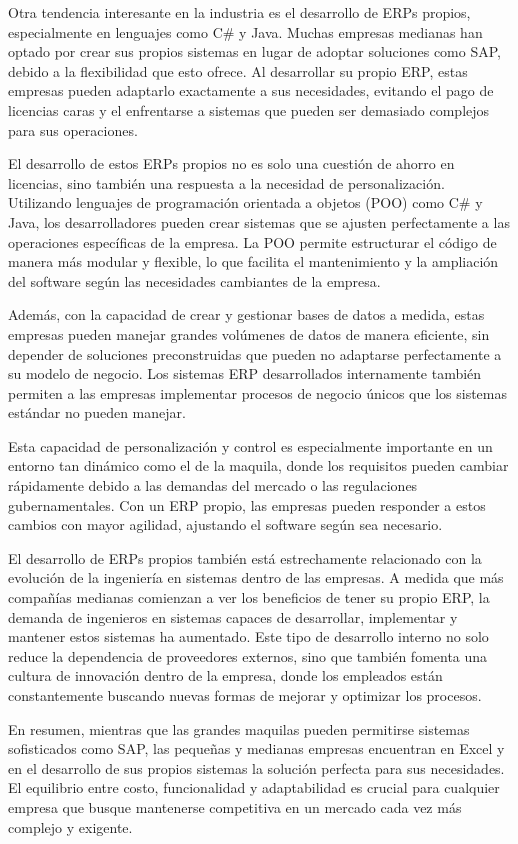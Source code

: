 \documentclass[
  10pt,
  letterpaper,
]{book}
\begin{document}
Otra tendencia interesante en la industria es el desarrollo de ERPs
propios, especialmente en lenguajes como C\# y Java. Muchas empresas
medianas han optado por crear sus propios sistemas en lugar de adoptar
soluciones como SAP, debido a la flexibilidad que esto ofrece. Al
desarrollar su propio ERP, estas empresas pueden adaptarlo exactamente a
sus necesidades, evitando el pago de licencias caras y el enfrentarse a
sistemas que pueden ser demasiado complejos para sus operaciones.

El desarrollo de estos ERPs propios no es solo una cuestión de ahorro en
licencias, sino también una respuesta a la necesidad de personalización.
Utilizando lenguajes de programación orientada a objetos (POO) como C\#
y Java, los desarrolladores pueden crear sistemas que se ajusten
perfectamente a las operaciones específicas de la empresa. La POO
permite estructurar el código de manera más modular y flexible, lo que
facilita el mantenimiento y la ampliación del software según las
necesidades cambiantes de la empresa.

Además, con la capacidad de crear y gestionar bases de datos a medida,
estas empresas pueden manejar grandes volúmenes de datos de manera
eficiente, sin depender de soluciones preconstruidas que pueden no
adaptarse perfectamente a su modelo de negocio. Los sistemas ERP
desarrollados internamente también permiten a las empresas implementar
procesos de negocio únicos que los sistemas estándar no pueden manejar.

Esta capacidad de personalización y control es especialmente importante
en un entorno tan dinámico como el de la maquila, donde los requisitos
pueden cambiar rápidamente debido a las demandas del mercado o las
regulaciones gubernamentales. Con un ERP propio, las empresas pueden
responder a estos cambios con mayor agilidad, ajustando el software
según sea necesario.

El desarrollo de ERPs propios también está estrechamente relacionado con
la evolución de la ingeniería en sistemas dentro de las empresas. A
medida que más compañías medianas comienzan a ver los beneficios de
tener su propio ERP, la demanda de ingenieros en sistemas capaces de
desarrollar, implementar y mantener estos sistemas ha aumentado. Este
tipo de desarrollo interno no solo reduce la dependencia de proveedores
externos, sino que también fomenta una cultura de innovación dentro de
la empresa, donde los empleados están constantemente buscando nuevas
formas de mejorar y optimizar los procesos.

En resumen, mientras que las grandes maquilas pueden permitirse sistemas
sofisticados como SAP, las pequeñas y medianas empresas encuentran en
Excel y en el desarrollo de sus propios sistemas la solución perfecta
para sus necesidades. El equilibrio entre costo, funcionalidad y
adaptabilidad es crucial para cualquier empresa que busque mantenerse
competitiva en un mercado cada vez más complejo y exigente.
\end{document}
